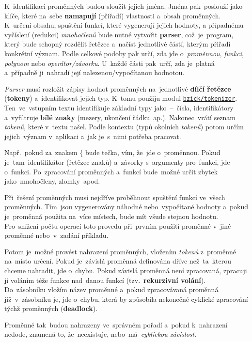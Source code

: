 \documentclass[11pt,a4paper]{report}
\begin{document}
            K~identifikaci proměnných budou sloužit jejich jména. Jména pak~poslouží jako klíče, které na~sebe \textbf{namapují} (přiřadí) vlastnosti a~obsah proměnných. K~určení obsahu, spuštění funkcí, které vygenerují jejich hodnoty, a případnému vyčíslení (redukci) \emph{mnohočlenů} bude nutné vytvořit \textbf{parser}, což~je~program, který bude schopný rozdělit řetězec a~načíst jednotlivé částí, kterým přiřadí konkrétní význam. Podle celkové podoby pak určí, zda jde o~\emph{proměnnou}, \emph{funkci}, \emph{polynom} nebo \emph{operátor/závorku}. U~každé části pak~určí, zda je~platná a~případně ji~nahradí její nalezenou/vypočítanou hodnotou.
            
            \emph{Parser} musí rozložit zápisy hodnot proměnných na~jednotlivé \textbf{dílčí řetězce} (\textbf{tokeny}) a~identifikovat jejich typ. K~tomu použiju modul \href{github.com/bzick/tokenizer}{\texttt{bzick/tokenizer}}. Ten~ve~vstupním textu identifikuje základní typy jako~--~čísla, identifikátory a~vyfiltruje \textbf{bílé znaky} (mezery, ukončení řádku~ap.). Nakonec~vrátí seznam \emph{tokenů}, které v~textu našel. Podle kontextu (typů okolních \emph{tokenů}) potom určím jejich~význam v~aplikaci a~jak je~s~nimi potřeba pracovat.
            
            Např.~pokud za~znakem \{ bude tečka, vím, že~jde o~proměnnou. Pokud je~tam~identifikátor (řetězec znaků) a~závorky s~argumenty pro~funkci, jde o~funkci. Po~zpracování proměnných a~funkcí bude~možné určit zbytek jako~mnohočleny, zlomky~apod.
            
            Při~řešení proměnných musí nejdříve proběhnout spuštění funkcí ve~všech proměnných. Tím~jsou vygenerovány náhodné nebo~vypočítané hodnoty a~pokud je~proměnná použita na~více místech, bude mít všude stejnou hodnotu. Pro~snížení počtu operací toto provedu při~prvním použití proměnné v~jiné proměnné nebo~v~zadání příkladu.

            Potom je~možné provést nahrazení proměnných, vložením \emph{tokenů} z~proměnné na~místo určení. Pokud je~závislá proměnná definována dříve než~ta~kterou chceme nahradit, jde o~chybu. Pokud závislá proměnná není zpracovaná, zpracuji ji voláním téže funkce nad~danou funkcí (tzv.~\textbf{rekurzivní volání}). Do~zásobníku vložím název proměnné a~pokud zpracovávaná proměnná již~v~zásobníku je, jde o~chybu, která by způsobila nekonečné cyklické zpracování týchž proměnných (\textbf{deadlock}).
            
            Proměnné tak~budou nahrazeny ve~správném pořadí a~pokud k~nahrazení nedode, znamená to, že~neexistuje, nebo~má~\emph{cyklickou závislost}.
\end{document}
